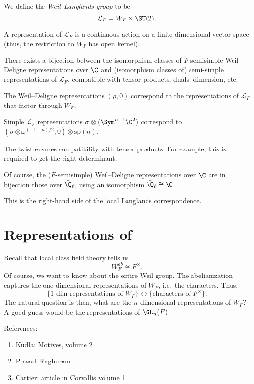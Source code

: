 \documentclass[a4paper]{article}
\renewcommand\sp{\mathrm{sp}}
\begin{document}
\begin{defi}
  We define the \emph{Weil--Langlands group} to be
  \[
    \mathcal{L}_F = W_F \times \SU(2).
  \]
\end{defi}
A representation of $\mathcal{L}_F$ is a continuous action on a finite-dimensional vector space (thus, the restriction to $W_F$ has open kernel).
\begin{thm}
  There exists a bijection between the isomorphism classes of $F$-semisimple Weil--Deligne representations over $\C$ and (isomorphism classes of) semi-simple representations of $\mathcal{L}_F$, compatible with tensor products, duals, dimension, etc.

  The Weil--Deligne representations $(\rho, 0)$ correspond to the representations of $\mathcal{L}_F$ that factor through $W_F$.

  Simple $\mathcal{L}_F$ representations $\sigma \otimes (\Sym^{n - 1} \C^2)$ correspond to $(\sigma \otimes \omega^{(-1 + n)/2}, 0) \otimes \sp(n)$.
\end{thm}
The twist ensures compatibility with tensor products. For example, this is required to get the right determinant. %

Of course, the ($F$-semisimple) Weil--Deligne representations over $\C$ are in bijection those over $\bar{\Q}_\ell$, using an isomorphism $\bar{\Q}_\ell \cong \C$.

This is the right-hand side of the local Langlands correspondence.

\section{Representations of }
Recall that local class field theory tells us
\[
  W_F^{ab} \cong F^\times.
\]
Of course, we want to know about the entire Weil group. The abelianization captures the one-dimensional representations of $W_F$, i.e.\ the characters. Thus,
\[
  \{1\text{-dim representations of }W_F\} \leftrightarrow \{\text{characters of }F^\times\}.
\]
The natural question is then, what are the $n$-dimensional representations of $W_F$? A good guess would be the representations of $\GL_n(F)$.

References:
\begin{enumerate}
  \item Kudla: Motives, volume 2
  \item Prasad--Raghuram
  \item Cartier: article in Corvallis volume 1
\end{enumerate}
\end{document}
